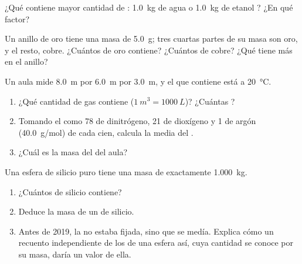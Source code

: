 \begin{exercise}[$\star\star$]\label{exo:g10:the-mole:11}
¿Qué contiene mayor cantidad de : \qty{1.0}{kg} de agua
 o \qty{1.0}{kg} de etanol ? ¿En qué factor?
\end{exercise}

\begin{exercise}[$\star\star\star$]\label{exo:g10:the-mole:12}
Un anillo de oro tiene una masa de \qty{5.0}{g}; tres cuartas partes de
su masa son oro, y el resto, cobre. ¿Cuántos  de oro contiene?
¿Cuántos  de cobre? ¿Qué  tiene más  en el anillo?
\end{exercise}

\begin{exercise}[$\star\star\star$]\label{exo:g10:the-mole:13}
Un aula mide \qty{8.0}{m} por \qty{6.0}{m} por \qty{3.0}{m}, y el 
que contiene está a \qty{20}{\celsius}.
\begin{enumerate}
  \item ¿Qué cantidad de gas contiene ($\qty{1}{m^3} =
        \qty{1000}{L}$)? ¿Cuántas ?
  \item Tomando el  como 78  de dinitrógeno, 21 de
        dioxígeno y 1 de argón (\qty{40.0}{g/mol}) de cada cien, calcula
        la  media del .
  \item ¿Cuál es la masa del  del aula?
\end{enumerate}
\end{exercise}

\begin{exercise}[$\star\star\star$]\label{exo:g10:the-mole:14}
Una esfera de silicio puro tiene una masa de exactamente \qty{1.000}{kg}.
\begin{enumerate}
  \item ¿Cuántos  de silicio contiene?
  \item Deduce la masa de un  de silicio.
  \item Antes de 2019, la  no estaba fijada, sino
        que se medía. Explica cómo un recuento independiente de los
         de una esfera así, cuya cantidad se conoce por su masa,
        daría un valor de ella.
\end{enumerate}
\end{exercise}

